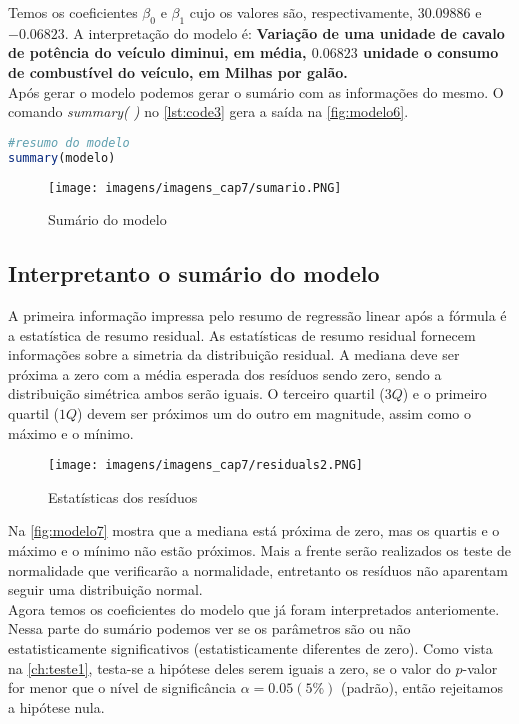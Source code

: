 \noindent Temos os coeficientes $\beta_0$ e $\beta_1$ cujo os valores são, respectivamente, $30.09886$ e $-0.06823$. A interpretação do modelo é: \textbf{Variação de uma unidade de cavalo de potência do veículo diminui, em média, $0.06823$ unidade o consumo de combustível do veículo, em Milhas por galão.}\\

\noindent Após gerar o modelo podemos gerar o sumário com as informações do mesmo. O comando \textit{summary( )} no \autoref{lst:code3} gera a saída na \autoref{fig:modelo6}.

\begin{lstlisting}[language=R, caption = {Sumário do modelo},label={lst:code8}]
#resumo do modelo
summary(modelo)
\end{lstlisting}

\begin{figure}[H]
\centering
\caption{Sumário do modelo}
\texttt{[image: imagens/imagens\_cap7/sumario.PNG]}
\label{fig:modelo6}
\end{figure}

\subsection{Interpretanto o sumário do modelo}

\noindent A primeira informação impressa pelo resumo de regressão linear após a fórmula é a estatística de resumo residual. As estatísticas de resumo residual fornecem informações sobre a simetria da distribuição residual. A mediana deve ser próxima a zero com a média esperada dos resíduos sendo zero, sendo a distribuição simétrica ambos serão iguais. O terceiro quartil ($3Q$) e o primeiro quartil ($1Q$) devem ser próximos um do outro em magnitude, assim como o máximo e o mínimo.


\begin{figure}[H]
\centering
\caption{Estatísticas dos resíduos}
\texttt{[image: imagens/imagens\_cap7/residuals2.PNG]}
\label{fig:modelo7}
\end{figure}

\noindent Na \autoref{fig:modelo7} mostra que a mediana está próxima de zero, mas os quartis e o máximo e o mínimo não estão próximos. Mais a frente serão realizados os teste de normalidade que verificarão a normalidade, entretanto os resíduos não aparentam seguir uma distribuição normal.\\

\noindent Agora temos os coeficientes do modelo que já foram interpretados anteriomente. Nessa parte do sumário podemos ver se os parâmetros são ou não estatisticamente significativos (estatisticamente diferentes de zero). Como vista na \autoref{ch:teste1}, testa-se a hipótese deles serem iguais a zero, se o valor do $p$-valor for menor que o nível de significância $\alpha = 0.05 (5\%)$ (padrão), então rejeitamos a hipótese nula. 

